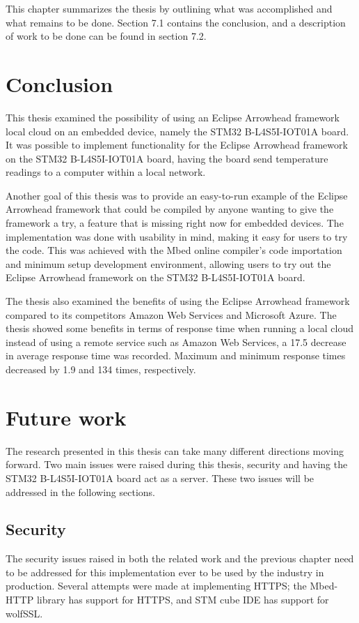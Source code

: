 This chapter summarizes the thesis by outlining what was accomplished and what remains to be done.  
Section 7.1 contains the conclusion, and a description of work to be done can be found in section 7.2.
\section{Conclusion}
This thesis examined the possibility of using an Eclipse Arrowhead framework local cloud on an embedded device, namely the STM32 B-L4S5I-IOT01A board. 
It was possible to implement functionality for the Eclipse Arrowhead framework on the STM32 B-L4S5I-IOT01A board, having the board send temperature readings to a computer within a local network.

Another goal of this thesis was to provide an easy-to-run example of the Eclipse Arrowhead framework that could be compiled by anyone wanting to give the framework a try, a feature that is missing right now for embedded devices.
The implementation was done with usability in mind, making it easy for users to try the code.
This was achieved with the Mbed online compiler's code importation and minimum setup development environment, allowing users to try out the Eclipse Arrowhead framework on the STM32 B-L4S5I-IOT01A board.

The thesis also examined the benefits of using the Eclipse Arrowhead framework compared to its competitors Amazon Web Services and Microsoft Azure.
The thesis showed some benefits in terms of response time when running a local cloud instead of using a remote service such as Amazon Web Services, a 17.5 decrease in average response time was recorded.
Maximum and minimum response times decreased by 1.9 and 134 times, respectively.  

\section{Future work}
The research presented in this thesis can take many different directions moving forward.
Two main issues were raised during this thesis, security and having the STM32 B-L4S5I-IOT01A board act as a server.
These two issues will be addressed in the following sections.
\subsection{Security}
The security issues raised in both the related work and the previous chapter need to be addressed for this implementation ever to be used by the industry in production. 
Several attempts were made at implementing HTTPS; the Mbed-HTTP library has support for HTTPS, and STM cube IDE has support for wolfSSL. 

